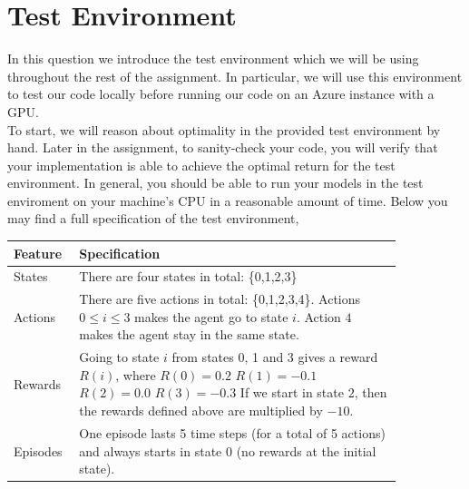 \section{Test Environment}

In this question we introduce the test environment which we will be using throughout the rest of the assignment. In particular, we will use this environment to test our code locally before running our code on an Azure instance with a GPU. \\

To start, we will reason about optimality in the provided test environment by hand. Later in the assignment, to sanity-check your code, you will verify that your implementation is able to achieve the optimal return for the test environment. In general, you should be able to run your models in the test enviroment on your machine's CPU in a reasonable amount of time. Below you may find a full specification of the test environment,


\begin{center}
	\begin{tabular}{| p{0.1\linewidth} | p{0.75\linewidth} |}
	\hline
	\textbf{Feature} & \textbf{Specification} \\ \hline
	States & There are four states in total: \{0,1,2,3\} \\[2ex] \hline
	Actions & \makecell[l]{There are five actions in total: \{0,1,2,3,4\}. \\ Actions $ 0 \leq i \leq 3 $ makes the agent go to state $ i $. \\ Action $ 4 $ makes the agent stay in the same state.} \\[2ex] \hline
	Rewards & \makecell[l]{Going to state $ i $ from states 0, 1 and 3 gives a reward $R(i) $, where \\ $R(0) = 0.2$ \\ $R(1) = -0.1$ \\ $R(2) = 0.0$ \\ $R(3) = -0.3$ \\ If we start in state $ 2 $, then the rewards defined above are multiplied by $ - 10 $.}   \\[2ex] \hline
	Episodes & One episode lasts 5 time steps (for a total of 5 actions) and always starts in state $ 0 $ (no rewards at the initial state). \\[2ex] \hline
	\end{tabular}
	\label{table:test_spec_1}
\end{center}

